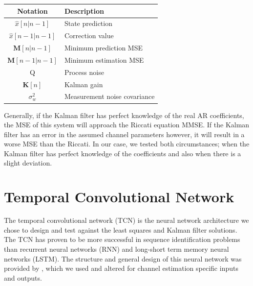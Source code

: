 \documentclass[twocolumn,letterpaper]{IEEEAerospaceCLS}  %
\begin{document}
\begin{table}[h!]
\centering
\begin{tabular}{|c|l|}
\hline
Notation           & Description \\ \hline              
\multirow{2}{*}{$\hat{x}[n|n-1]$} & \multirow{2}{*}{State prediction} \\
                   & \\ \hline
\multirow{2}{*}{$\hat{x}[n-1|n-1]$} & \multirow{2}{*}{Correction value} \\
                   & \\ \hline
\multirow{2}{*}{$\textbf{M}[n|n-1]$} & \multirow{2}{*}{Minimum prediction MSE} \\
                   & \\ \hline
\multirow{2}{*}{$\textbf{M}[n-1|n-1]$} & \multirow{2}{*}{Minimum estimation MSE} \\
                   & \\ \hline
\multirow{2}{*}{Q} & \multirow{2}{*}{Process noise} \\
                   & \\ \hline
\multirow{2}{*}{$\textbf{K}[n]$} & \multirow{2}{*}{Kalman gain} \\
                   & \\ \hline
\multirow{2}{*}{$\sigma_{w}^2$} & \multirow{2}{*}{Measurement noise covariance} \\
                   & \\ \hline
\end{tabular}
\end{table}

Generally, if the Kalman filter has perfect knowledge of the real AR coefficients, the MSE of this system will approach the Riccati equation MMSE. If the Kalman filter has an error in the assumed channel parameters however, it will result in a worse MSE than the Riccati.  In our case, we tested both circumstances; when the Kalman filter has perfect knowledge of the coefficients and also when there is a slight deviation. 

\section{Temporal Convolutional Network}
\label{sec:TCN}

The temporal convolutional network (TCN) is the neural network architecture we chose to design and test against the least squares and Kalman filter solutions. The TCN has proven to be more successful in sequence identification problems than recurrent neural networks (RNN) and long-short term memory neural networks (LSTM). The structure and general design of this neural network was provided by \cite{BaiTCN2018}, which we used and altered for channel estimation specific inputs and outputs. 
\end{document}
